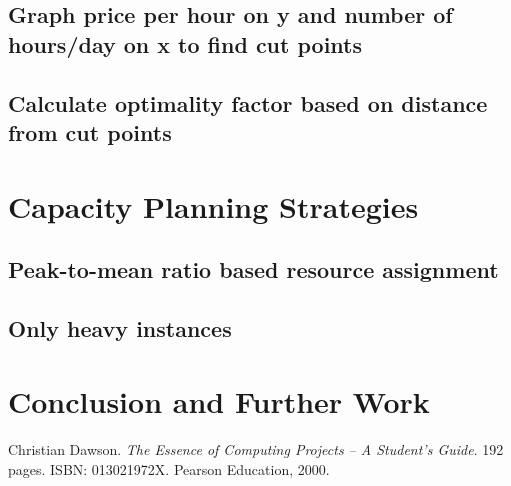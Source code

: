 \documentclass[]{final_report}
\begin{document}
\section{Graph price per hour on y and number of hours/day on x to find cut points}

\section{Calculate optimality factor based on distance from cut points}


\chapter{Capacity Planning Strategies}

\section{Peak-to-mean ratio based resource assignment}

\section{Only heavy instances}


\chapter{Conclusion and Further Work}


\newpage
\begin{thebibliography}{99}
 Christian Dawson. \emph{The Essence of Computing Projects -- A Student's Guide}. 192 pages. ISBN: 013021972X. Pearson Education, 2000.
\end{thebibliography}
\label{endpage}
\end{document}
